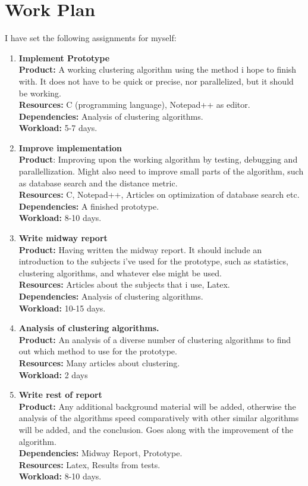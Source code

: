 \documentclass[10pt,a4paper]{article} %
\begin{document}
\section*{Work Plan}

I have set the following assignments for myself:
\begin{enumerate}
\item \textbf{Implement Prototype}\\
\textbf{Product:} A working clustering algorithm using the method i hope to finish with. It does not have to be quick or precise, nor parallelized, but it should be working.\\
\textbf{Resources:} C (programming language), Notepad++ as editor.\\
\textbf{Dependencies:} Analysis of clustering algorithms.\\
\textbf{Workload:} 5-7 days.
\item \textbf{Improve implementation}\\
\textbf{Product}: Improving upon the working algorithm by testing, debugging and parallellization. Might also need to improve small parts of the algorithm, such as database search and the distance metric.\\
\textbf{Resources:} C, Notepad++, Articles on optimization of database search etc.\\
\textbf{Dependencies:} A finished prototype.\\
\textbf{Workload:} 8-10 days.
\item \textbf{Write midway report}\\ 
\textbf{Product:} Having written the midway report. It should include an introduction to the subjects i've used for the prototype, such as statistics, clustering algorithms, and whatever else might be used.\\
\textbf{Resources:} Articles about the subjects that i use, Latex.\\
\textbf{Dependencies:} Analysis of clustering algorithms.\\
\textbf{Workload:} 10-15 days.\\
\item \textbf{Analysis of clustering algorithms.}\\
\textbf{Product:} An analysis of a diverse number of clustering algorithms to find out which method to use for the prototype.\\
\textbf{Resources:} Many articles about clustering.\\
\textbf{Workload:} 2 days
\item \textbf{Write rest of report}\\
\textbf{Product:} Any additional background material will be added, otherwise the analysis of the algorithms speed comparatively with other similar algorithms will be added, and the conclusion. Goes along with the improvement of the algorithm.\\
\textbf{Dependencies:} Midway Report, Prototype.\\
\textbf{Resources:} Latex, Results from tests.\\
\textbf{Workload:} 8-10 days.\\
\end{enumerate}
\end{document}
